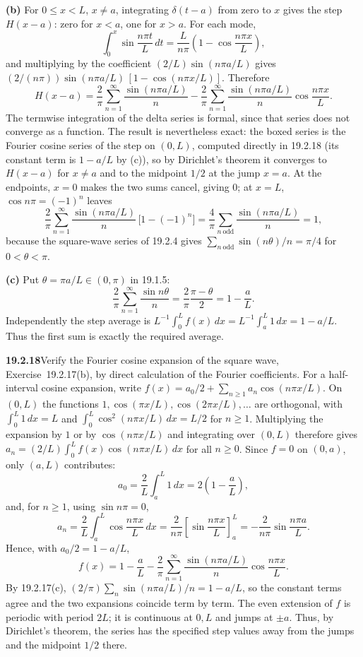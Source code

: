 \textbf{(b)} For $0\le x<L$, $x\ne a$, integrating $\delta(t-a)$ from
zero to $x$ gives the step $H(x-a)$: zero for $x<a$, one for $x>a$.
For each mode,
\[
\int_0^x\sin\frac{n\pi t}{L}\,dt
=\frac{L}{n\pi}\left(1-\cos\frac{n\pi x}{L}\right),
\]
and multiplying by the coefficient $(2/L)\sin(n\pi a/L)$ gives
$(2/(n\pi))\sin(n\pi a/L)\,[1-\cos(n\pi x/L)]$. Therefore
\[
\boxed{H(x-a)=\frac2\pi\sum_{n=1}^{\infty}
\frac{\sin(n\pi a/L)}n
-\frac2\pi\sum_{n=1}^{\infty}
\frac{\sin(n\pi a/L)}n\cos\frac{n\pi x}{L}.}
\]
The termwise integration of the delta series is formal, since that
series does not converge as a function. The result is nevertheless
exact: the boxed series is the Fourier cosine series of the step on
$(0,L)$, computed directly in 19.2.18 (its constant term is
$1-a/L$ by (c)), so by Dirichlet's theorem it converges to $H(x-a)$ for
$x\ne a$ and to the midpoint $1/2$ at the jump $x=a$. At the endpoints,
$x=0$ makes the two sums cancel, giving $0$; at $x=L$,
$\cos n\pi=(-1)^n$ leaves
\[
\frac2\pi\sum_{n=1}^{\infty}\frac{\sin(n\pi a/L)}n\,\bigl[1-(-1)^n\bigr]
=\frac4\pi\sum_{n\ \mathrm{odd}}\frac{\sin(n\pi a/L)}n=1,
\]
because the square-wave series of 19.2.4 gives
$\sum_{n\ \mathrm{odd}}\sin(n\theta)/n=\pi/4$ for $0<\theta<\pi$.

\textbf{(c)} Put $\theta=\pi a/L\in(0,\pi)$ in 19.1.5:
\[
\frac2\pi\sum_{n=1}^{\infty}\frac{\sin n\theta}{n}
=\frac2\pi\frac{\pi-\theta}{2}=1-\frac aL.
\]
Independently the step average is
$L^{-1}\int_0^Lf(x)\,dx=L^{-1}\int_a^L1\,dx=1-a/L$.
Thus the first sum is exactly the required average.

\par\bigskip
\noindent\textbf{19.2.18}\quad Verify the Fourier cosine expansion
of the square wave, Exercise~19.2.17(b), by direct calculation of
the Fourier coefficients.
\solution
For a half-interval cosine expansion, write
$f(x)=a_0/2+\sum_{n\ge1}a_n\cos(n\pi x/L)$. On $(0,L)$ the functions
$1,\cos(\pi x/L),\cos(2\pi x/L),\ldots$ are orthogonal, with
$\int_0^L1\,dx=L$ and $\int_0^L\cos^2(n\pi x/L)\,dx=L/2$ for $n\ge1$.
Multiplying the expansion by $1$ or by $\cos(n\pi x/L)$ and integrating
over $(0,L)$ therefore gives
$a_n=(2/L)\int_0^Lf(x)\cos(n\pi x/L)\,dx$ for all $n\ge0$. Since $f=0$
on $(0,a)$, only $(a,L)$ contributes:
\[
a_0=\frac2L\int_a^L1\,dx=2\left(1-\frac aL\right),
\]
and, for $n\ge1$, using $\sin n\pi=0$,
\[
a_n=\frac2L\int_a^L\cos\frac{n\pi x}{L}\,dx
=\frac2{n\pi}\left[\sin\frac{n\pi x}{L}\right]_a^L
=-\frac2{n\pi}\sin\frac{n\pi a}{L}.
\]
Hence, with $a_0/2=1-a/L$,
\[
\boxed{f(x)=1-\frac aL-\frac2\pi\sum_{n=1}^{\infty}
\frac{\sin(n\pi a/L)}n\cos\frac{n\pi x}{L}.}
\]
By 19.2.17(c), $(2/\pi)\sum_n\sin(n\pi a/L)/n=1-a/L$, so the constant
terms agree and the two expansions coincide term by term. The even
extension of $f$ is periodic with period $2L$; it is continuous at
$0,L$ and jumps at $\pm a$. Thus, by Dirichlet's theorem, the series has
the specified step values away from the jumps and the midpoint $1/2$
there.


